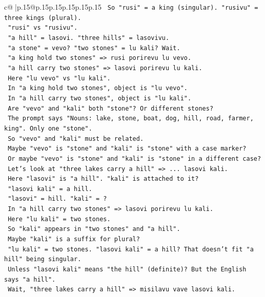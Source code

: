 \documentclass{article}
\begin{document}
{\begin{supertabular}{c@{$\;$}|p{.15\linewidth}@{}p{.15\linewidth}p{.15\linewidth}p{.15\linewidth}p{.15\linewidth}p{.15\linewidth}}
{{{\texttt{   So "rusi" = a king (singular). "rusivu" = three kings (plural).} \\
\texttt{   "rusi" vs "rusivu".} \\
\texttt{   "a hill" = lasovi. "three hills" = lasovivu.} \\
\texttt{   "a stone" = vevo? "two stones" = lu kali? Wait.} \\
\texttt{   "a king hold two stones" => rusi porirevu lu vevo.} \\
\texttt{   "a hill carry two stones" => lasovi porirevu lu kali.} \\
\texttt{   Here "lu vevo" vs "lu kali".} \\
\texttt{   In "a king hold two stones", object is "lu vevo".} \\
\texttt{   In "a hill carry two stones", object is "lu kali".} \\
\texttt{   Are "vevo" and "kali" both "stone"? Or different stones?} \\
\texttt{   The prompt says "Nouns: lake, stone, boat, dog, hill, road, farmer, king". Only one "stone".} \\
\texttt{   So "vevo" and "kali" must be related.} \\
\texttt{   Maybe "vevo" is "stone" and "kali" is "stone" with a case marker?} \\
\texttt{   Or maybe "vevo" is "stone" and "kali" is "stone" in a different case?} \\
\texttt{   Let's look at "three lakes carry a hill" => ... lasovi kali.} \\
\texttt{   Here "lasovi" is "a hill". "kali" is attached to it?} \\
\texttt{   "lasovi kali" = a hill.} \\
\texttt{   "lasovi" = hill. "kali" = ?} \\
\texttt{   In "a hill carry two stones" => lasovi porirevu lu kali.} \\
\texttt{   Here "lu kali" = two stones.} \\
\texttt{   So "kali" appears in "two stones" and "a hill".} \\
\texttt{   Maybe "kali" is a suffix for plural?} \\
\texttt{   "lu kali" = two stones. "lasovi kali" = a hill? That doesn't fit "a hill" being singular.} \\
\texttt{   Unless "lasovi kali" means "the hill" (definite)? But the English says "a hill".} \\
\texttt{   Wait, "three lakes carry a hill" => misilavu vave lasovi kali.} \\
}}}
\end{supertabular}}
\end{document}
